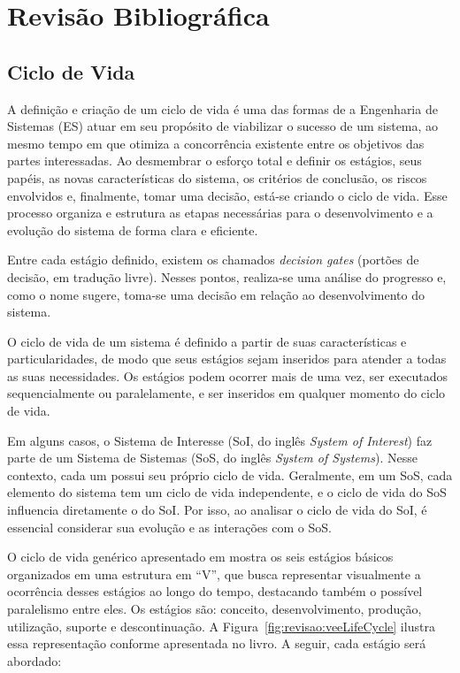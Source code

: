 
\chapter{Revisão Bibliográfica}\label{chap:revisao}

\section{Ciclo de Vida}\label{sec:revisao:ciclodevida}

	A definição e criação de um ciclo de vida é uma das formas de a Engenharia de Sistemas (ES) atuar em seu propósito de viabilizar o sucesso de um sistema, ao mesmo tempo em que otimiza a concorrência existente entre os objetivos das partes interessadas. Ao desmembrar o esforço total e definir os estágios, seus papéis, as novas características do sistema, os critérios de conclusão, os riscos envolvidos e, finalmente, tomar uma decisão, está-se criando o ciclo de vida. Esse processo organiza e estrutura as etapas necessárias para o desenvolvimento e a evolução do sistema de forma clara e eficiente.

	Entre cada estágio definido, existem os chamados \textit{decision gates} (portões de decisão, em tradução livre). Nesses pontos, realiza-se uma análise do progresso e, como o nome sugere, toma-se uma decisão em relação ao desenvolvimento do sistema.

	O ciclo de vida de um sistema é definido a partir de suas características e particularidades, de modo que seus estágios sejam inseridos para atender a todas as suas necessidades. Os estágios podem ocorrer mais de uma vez, ser executados sequencialmente ou paralelamente, e ser inseridos em qualquer momento do ciclo de vida.

	Em alguns casos, o Sistema de Interesse (SoI, do inglês \textit{System of Interest}) faz parte de um Sistema de Sistemas (SoS, do inglês \textit{System of Systems}). Nesse contexto, cada um possui seu próprio ciclo de vida. Geralmente, em um SoS, cada elemento do sistema tem um ciclo de vida independente, e o ciclo de vida do SoS influencia diretamente o do SoI. Por isso, ao analisar o ciclo de vida do SoI, é essencial considerar sua evolução e as interações com o SoS.

	O ciclo de vida genérico apresentado em \cite{incoseHandbook} mostra os seis estágios básicos organizados em uma estrutura em ``V'', que busca representar visualmente a ocorrência desses estágios ao longo do tempo, destacando também o possível paralelismo entre eles. Os estágios são: conceito, desenvolvimento, produção, utilização, suporte e descontinuação. A Figura~\ref{fig:revisao:veeLifeCycle} ilustra essa representação conforme apresentada no livro. A seguir, cada estágio será abordado:

